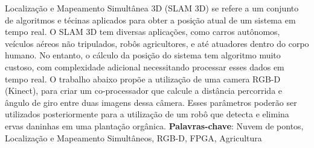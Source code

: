 
\setlength{\absparsep}{18pt} %
\begin{resumo}
	Localização e Mapeamento Simultânea 3D (SLAM 3D) se refere a um conjunto de algoritmos e técinas aplicados para obter a posição atual de um sistema em tempo real. O SLAM 3D tem diversas aplicações, como carros autônomos, veículos aéreos não tripulados, robôs agricultores, e até atuadores dentro do corpo humano. No entanto, o cálculo da posição do sistema tem algoritmo muito custoso, com complexidade adicional necessitando processar esses dados em tempo real. O trabalho abaixo propõe a utilização de uma camera RGB-D (Kinect), para criar um co-processador que calcule a distância percorrida e ângulo de giro entre duas imagens dessa câmera. Esses parâmetros poderão ser utilizados posteriormente para a utilização de um robô que detecta e elimina ervas daninhas em uma plantação orgânica.
	\vspace{\onelineskip}
	\noindent 
	\textbf{Palavras-chave}: Nuvem de pontos, Localização e Mapeamento Simultâneos, RGB-D, FPGA, Agricultura
\end{resumo}

\begin{comment}
\begin{resumo}[Abstract]
	\begin{otherlanguage*}{english}
		Resumo em ingles
		
		\vspace{\onelineskip}
		\noindent 
		\textbf{Keywords}: keyword 1.
	\end{otherlanguage*}
\end{resumo}
\end{comment}